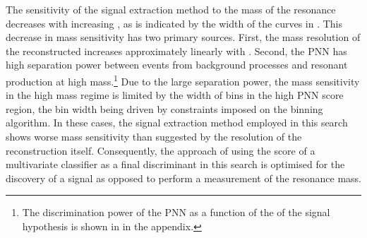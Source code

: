 The sensitivity of the signal extraction method to the mass of the
resonance decreases with increasing \mX, as is indicated by the width
of the curves in . This decrease in mass
sensitivity has two primary sources. First, the mass resolution of the
reconstructed \mHH increases approximately linearly with \mX. Second,
the PNN has high separation power between events from background
processes and resonant \HH production at high mass.\footnote{The
  discrimination power of the PNN as a function of the \mX of the
  signal hypothesis is shown in  in the
  appendix.}  Due to the large separation power, the mass sensitivity
in the high mass regime is limited by the width of bins in the high
PNN score region, the bin width being driven by constraints imposed on
the binning algorithm. In these cases, the signal extraction method
employed in this search shows worse mass sensitivity than suggested by
the resolution of the \mHH reconstruction itself. Consequently, the
approach of using the score of a multivariate classifier as a final
discriminant in this search is optimised for the discovery of a signal
as opposed to perform a measurement of the resonance mass.





%   

